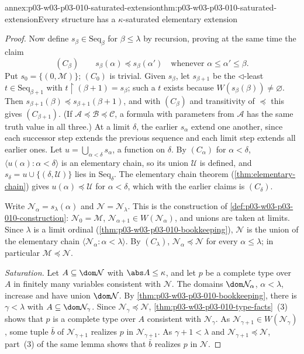 \begin{annexitem}{annex:p03-w03-p03-010-saturated-extension}{thm:p03-w03-p03-010-saturated-extension}{Every structure has a \(\kappa\)-saturated elementary extension}
\begin{proof}
Now define \(s_\beta\in\mathrm{Seq}_\beta\) for \(\beta\leq\lambda\) by
recursion, proving at the same time the claim
\[
  (C_\beta)\qquad s_\beta(\alpha)\preccurlyeq s_\beta(\alpha')
  \quad\text{whenever }\alpha\leq\alpha'\leq\beta .
\]
Put \(s_0=\{(0,\mathcal M)\}\); \((C_0)\) is trivial.  Given \(s_\beta\),
let \(s_{\beta+1}\) be the \(\lhd\)-least \(t\in\mathrm{Seq}_{\beta+1}\)
with \(t\restriction(\beta+1)=s_\beta\); such a \(t\) exists because
\(W(s_\beta(\beta))\ne\varnothing\).  Then
\(s_{\beta+1}(\beta)\preccurlyeq s_{\beta+1}(\beta+1)\), and with
\((C_\beta)\) and transitivity of \(\preccurlyeq\) this gives
\((C_{\beta+1})\).  (If \(\mathcal A\preccurlyeq\mathcal B\preccurlyeq
\mathcal C\), a formula with parameters from \(\mathcal A\) has the same
truth value in all three.)  At a limit \(\delta\), the earlier
\(s_\alpha\) extend one another, since each successor step extends the
previous sequence and each limit step extends all earlier ones.  Let
\(u=\bigcup_{\alpha<\delta}s_\alpha\), a function on \(\delta\).  By
\((C_\alpha)\) for \(\alpha<\delta\),
\(\langle u(\alpha):\alpha<\delta\rangle\) is an elementary chain, so its
union \(\mathcal U\) is defined, and \(s_\delta=u\cup\{(\delta,\mathcal
U)\}\) lies in \(\mathrm{Seq}_\delta\).  The elementary chain theorem
(\cref{thm:elementary-chain}) gives \(u(\alpha)\preccurlyeq\mathcal U\) for
\(\alpha<\delta\), which with the earlier claims is \((C_\delta)\).

Write \(\mathcal N_\alpha=s_\lambda(\alpha)\) and
\(\mathcal N=\mathcal N_\lambda\).  This is the construction of
\cref{def:p03-w03-p03-010-construction}: \(\mathcal N_0=\mathcal M\),
\(\mathcal N_{\alpha+1}\in W(\mathcal N_\alpha)\), and unions are taken at
limits.  Since \(\lambda\) is a limit ordinal
(\cref{thm:p03-w03-p03-010-bookkeeping}), \(\mathcal N\) is the union of
the elementary chain \(\langle\mathcal N_\alpha:\alpha<\lambda\rangle\).
By \((C_\lambda)\), \(\mathcal N_\alpha\preccurlyeq\mathcal N\) for every
\(\alpha\leq\lambda\); in particular \(\mathcal M\preccurlyeq\mathcal N\).

\emph{Saturation.}  Let \(A\subseteq\dom\mathcal N\) with
\(\abs A\leq\kappa\), and let \(p\) be a complete type over \(A\) in
finitely many variables consistent with \(\mathcal N\).  The domains
\(\dom\mathcal N_\alpha\), \(\alpha<\lambda\), increase and have union
\(\dom\mathcal N\).  By \cref{thm:p03-w03-p03-010-bookkeeping}, there is
\(\gamma<\lambda\) with \(A\subseteq\dom\mathcal N_\gamma\).  Since
\(\mathcal N_\gamma\preccurlyeq\mathcal N\),
\cref{thm:p03-w03-p03-010-type-facts}~(3) shows that \(p\) is a complete
type over \(A\) consistent with \(\mathcal N_\gamma\).  As
\(\mathcal N_{\gamma+1}\in W(\mathcal N_\gamma)\), some tuple \(\bar b\)
of \(\mathcal N_{\gamma+1}\) realizes \(p\) in \(\mathcal N_{\gamma+1}\).
As \(\gamma+1<\lambda\) and \(\mathcal N_{\gamma+1}\preccurlyeq\mathcal
N\), part~(3) of the same lemma shows that \(\bar b\) realizes \(p\) in
\(\mathcal N\).


\end{proof}
\end{annexitem}
